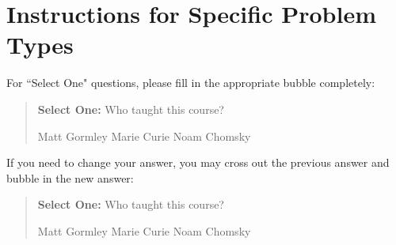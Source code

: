 \documentclass[11pt,addpoints,answers]{exam}
\newcommand{\blackcircle}{\tikz\draw[black,fill=black] (0,0) circle (1ex);}
\begin{document}



\section*{Instructions for Specific Problem Types}

For ``Select One" questions, please fill in the appropriate bubble completely:

\begin{quote}
\textbf{Select One:} Who taught this course?
    \begin{checkboxes}
     \CorrectChoice Matt Gormley
     \choice Marie Curie
     \choice Noam Chomsky
    \end{checkboxes}
\end{quote}

If you need to change your answer, you may cross out the previous answer and bubble in the new answer:

\begin{quote}
\textbf{Select One:} Who taught this course?
    {
    \begin{checkboxes}
     \CorrectChoice Matt Gormley
     \choice Marie Curie \checkboxchar{\xcancel{\blackcircle}{}}
     \choice Noam Chomsky
    \end{checkboxes}
    }
\end{quote}
\end{document}
